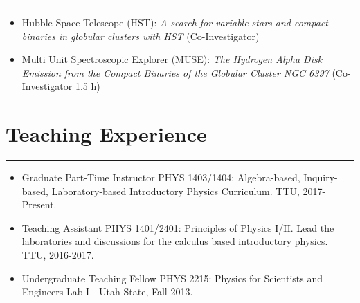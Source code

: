 \documentclass[letterpaper,10pt]{article}
\begin{document}
\hrule
\vspace{.3 cm}


  \begin{itemize}[label=$\blacktriangleright$]
      \item Hubble Space Telescope (HST): \emph{ A search for variable stars and compact binaries in globular clusters with HST } (Co-Investigator)
  \end{itemize}




  \begin{itemize}[label=$\blacktriangleright$]
        \item Multi Unit Spectroscopic Explorer (MUSE): \emph{The Hydrogen Alpha Disk Emission from the Compact Binaries of the Globular Cluster NGC 6397} (Co-Investigator 1.5 h)
  \end{itemize}


\section*{Teaching Experience}

\hrule
\vspace{.3 cm}


\begin{itemize}[label=$\blacktriangleright$]
\item   Graduate Part-Time Instructor PHYS 1403/1404: Algebra-based, Inquiry-based, Laboratory-based Introductory Physics Curriculum. TTU, 2017-Present.  
 
 \item   Teaching Assistant  PHYS 1401/2401: Principles of Physics I/II. Lead the laboratories and discussions for the calculus based introductory physics. TTU, 2016-2017.
  

 \item Undergraduate Teaching Fellow  PHYS 2215: Physics for Scientists and Engineers Lab I -  Utah State, Fall 2013.
  \end{itemize}
  
\end{document}
